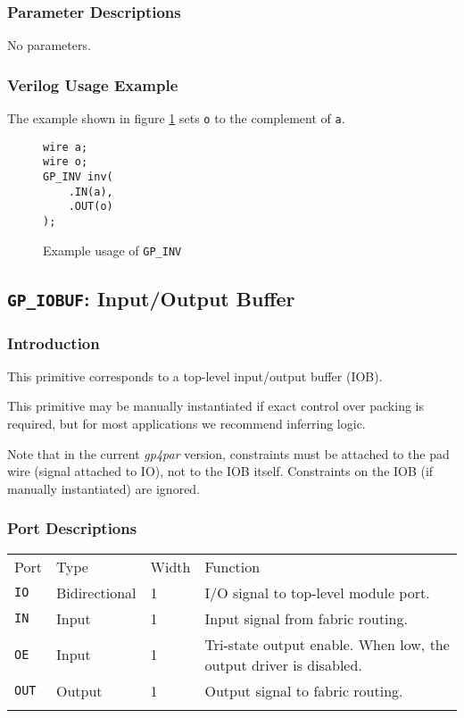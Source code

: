 \documentclass[11pt]{article}
\newcommand{\namestyle}[1]{\textit{#1}}
\newcommand{\tokenstyle}[1]{\texttt{#1}}
\newcommand{\wirestyle}[1]{\texttt{#1}}
\newcommand{\whenstyle}[1]{{\fontseries{sb}\selectfont#1}}
\newcommand{\thinhline}{\Xhline{1\arrayrulewidth}}
\newcommand{\thickhline}{\Xhline{2.5\arrayrulewidth}}
\begin{document}
\subsubsection{Parameter Descriptions}

No parameters.

\subsubsection{Verilog Usage Example}

The example shown in figure \ref{gp-inv-example} sets \wirestyle{o} to the complement of \wirestyle{a}.

\begin{figure}[h]
\begin{lstlisting}
wire a;
wire o;
GP_INV inv(
	.IN(a),
	.OUT(o)
);
\end{lstlisting}
\caption{Example usage of \tokenstyle{GP\_INV}}
\label{gp-inv-example}
\end{figure}


\pagebreak
\subsection{\tokenstyle{GP\_IOBUF}: Input/Output Buffer}
\label{gp-iobuf}

\subsubsection{Introduction}
This primitive corresponds to a top-level input/output buffer (IOB).

This primitive may be manually instantiated if exact control over packing is required, but for most applications we
recommend inferring logic.

Note that in the current \namestyle{gp4par} version, constraints must be attached to the pad wire (signal attached to IO), not to the IOB itself. Constraints on the IOB (if manually instantiated) are ignored.

\subsubsection{Port Descriptions}

\begin{tabularx}{\textwidth}{lllX}
\thinhline
\whenstyle{Port} & \whenstyle{Type} & \whenstyle{Width} & \whenstyle{Function} \\
\thickhline
\tokenstyle{IO} & Bidirectional & 1 & I/O signal to top-level module port. \\
\thinhline
\tokenstyle{IN} & Input & 1 & Input signal from fabric routing. \\
\thinhline
\tokenstyle{OE} & Input & 1 & Tri-state output enable. When low, the output driver is disabled. \\
\thinhline
\tokenstyle{OUT} & Output & 1 & Output signal to fabric routing. \\
\thinhline
\end{tabularx}
\end{document}
